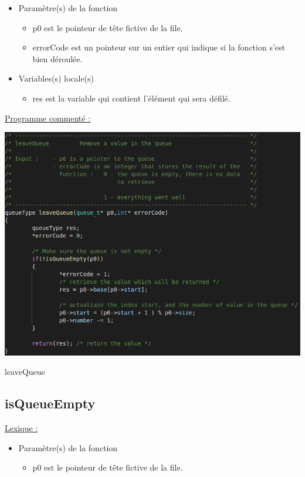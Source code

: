 \documentclass[a4paper]{article}
\begin{document}
\begin{itemize}

\item Paramètre(s) de la fonction  

\begin{itemize}

\item p0 est le pointeur de tête fictive de la file.

\item errorCode est un pointeur sur un entier qui indique si la fonction s'est bien déroulée.

\end{itemize}
\item Variables(s) locale(s)  

\begin{itemize}

\item res est la variable qui contient l'élément qui sera défilé.

\end{itemize}
\end{itemize}
\underline{Programme commenté :}
\begin{center}
\includegraphics[scale=0.4]{leaveQueue.png}

leaveQueue
\end{center}
\subsection{isQueueEmpty}
\underline{Lexique :}

\begin{itemize}

\item Paramètre(s) de la fonction  

\begin{itemize}

\item p0 est le pointeur de tête fictive de la file.

\end{itemize}

\end{itemize}
\end{document}
